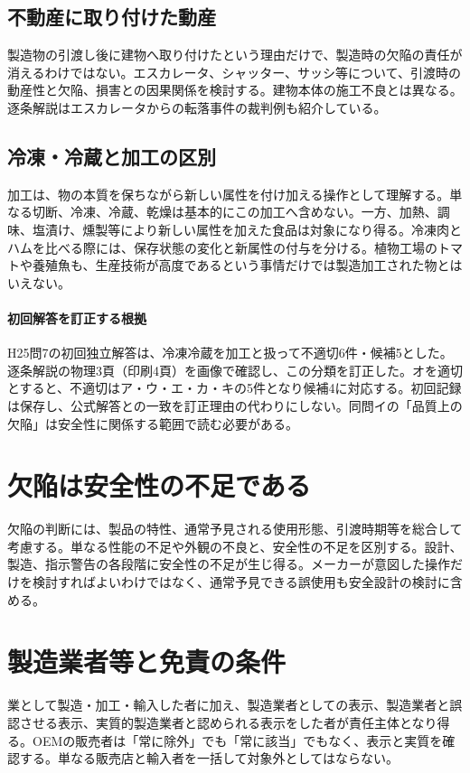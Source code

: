 \subsection{不動産に取り付けた動産}
\label{theory:pl:attachment}
製造物の引渡し後に建物へ取り付けたという理由だけで、製造時の欠陥の責任が消えるわけではない。エスカレータ、シャッター、サッシ等について、引渡時の動産性と欠陥、損害との因果関係を検討する。建物本体の施工不良とは異なる。逐条解説はエスカレータからの転落事件の裁判例も紹介している。\autocite{pl_definitions2018}

\subsection{冷凍・冷蔵と加工の区別}
\label{theory:pl:processing}
加工は、物の本質を保ちながら新しい属性を付け加える操作として理解する。単なる切断、冷凍、冷蔵、乾燥は基本的にこの加工へ含めない。一方、加熱、調味、塩漬け、燻製等により新しい属性を加えた食品は対象になり得る。冷凍肉とハムを比べる際には、保存状態の変化と新属性の付与を分ける。植物工場のトマトや養殖魚も、生産技術が高度であるという事情だけでは製造加工された物とはいえない。\autocite{pl_definitions2018}

\paragraph{初回解答を訂正する根拠}
H25問7の初回独立解答は、冷凍冷蔵を加工と扱って不適切6件・候補5とした。逐条解説の物理3頁（印刷4頁）を画像で確認し、この分類を訂正した。オを適切とすると、不適切はア・ウ・エ・カ・キの5件となり候補4に対応する。初回記録は保存し、公式解答との一致を訂正理由の代わりにしない。同問イの「品質上の欠陥」は安全性に関係する範囲で読む必要がある。

\section{欠陥は安全性の不足である}
\label{theory:pl:defect}
欠陥の判断には、製品の特性、通常予見される使用形態、引渡時期等を総合して考慮する。単なる性能の不足や外観の不良と、安全性の不足を区別する。設計、製造、指示警告の各段階に安全性の不足が生じ得る。メーカーが意図した操作だけを検討すればよいわけではなく、通常予見できる誤使用も安全設計の検討に含める。\autocite{pl_qa,pl_statute}

\section{製造業者等と免責の条件}
\label{theory:pl:producer}
業として製造・加工・輸入した者に加え、製造業者としての表示、製造業者と誤認させる表示、実質的製造業者と認められる表示をした者が責任主体となり得る。OEMの販売者は「常に除外」でも「常に該当」でもなく、表示と実質を確認する。単なる販売店と輸入者を一括して対象外としてはならない。\autocite{pl_statute,pl_qa}

